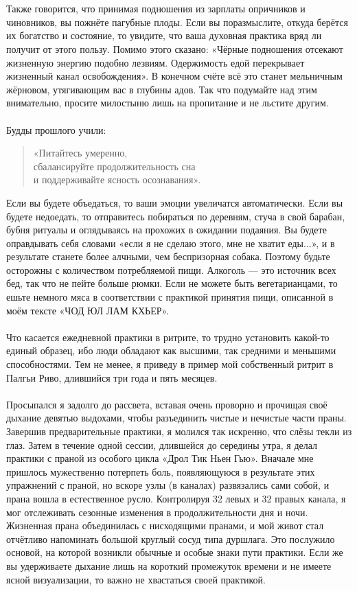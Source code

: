 \newpage
\\ \\ Также говорится, что принимая подношения из зарплаты опричников и чиновников, вы пожнёте пагубные плоды. Если вы поразмыслите, откуда берётся их богатство и состояние, то увидите, что ваша духовная практика вряд ли получит от этого пользу. Помимо этого сказано: «Чёрные подношения отсекают жизненную энергию подобно лезвиям. Одержимость едой перекрывает жизненный канал освобождения». В конечном счёте всё это станет мельничным жёрновом, утягивающим вас в глубины адов. Так что подумайте над этим внимательно, просите милостыню лишь на пропитание и не льстите другим.
\\ \\ Будды прошлого учили:
\begin{verse}«Питайтесь умеренно, \\ \indent
сбалансируйте продолжительность сна \\ \indent и поддерживайте ясность осознавания».
\end{verse}
Если вы будете объедаться, то ваши эмоции увеличатся автоматически. Если вы будете недоедать, то отправитесь побираться по деревням, стуча в свой барабан, бубня ритуалы и оглядываясь на прохожих в ожидании подаяния. Вы будете оправдывать себя словами «если я не сделаю этого, мне не хватит еды...», и в результате станете более алчными, чем беспризорная собака. Поэтому будьте осторожны с количеством потребляемой пищи. Алкоголь — это источник всех бед, так что не пейте больше рюмки. Если не можете быть вегетарианцами, то ешьте немного мяса в соответствии с практикой принятия пищи, описанной в моём тексте «ЧОД ЮЛ ЛАМ КХЬЕР».
\\ \\ Что касается ежедневной практики в ритрите, то трудно установить какой-то единый образец, ибо люди обладают как высшими, так средними и меньшими способностями. Тем не менее, я приведу в пример мой собственный ритрит в Палгьи Риво, длившийся три года и пять месяцев.
\newpage
\\ \\ Просыпался я задолго до рассвета, вставая очень проворно и прочищая своё дыхание девятью выдохами, чтобы разъединить чистые и нечистые части праны. Завершив предварительные практики, я молился так искренно, что слёзы текли из глаз. Затем в течение одной сессии, длившейся до середины утра, я делал практики с праной из особого цикла «Дрол Тик Ньен Гью». Вначале мне пришлось мужественно потерпеть боль, появляющуюся в результате этих упражнений с праной, но вскоре узлы (в каналах) развязались сами собой, и прана вошла в естественное русло. Контролируя 32 левых и 32 правых канала, я мог отслеживать сезонные изменения в продолжительности дня и ночи. Жизненная прана объединилась с нисходящими пранами, и мой живот стал отчётливо напоминать большой круглый сосуд типа дуршлага. Это послужило основой, на которой возникли обычные и особые знаки пути практики. Если же вы удерживаете дыхание лишь на короткий промежуток времени и не имеете ясной визуализации, то важно не хвастаться своей практикой.

